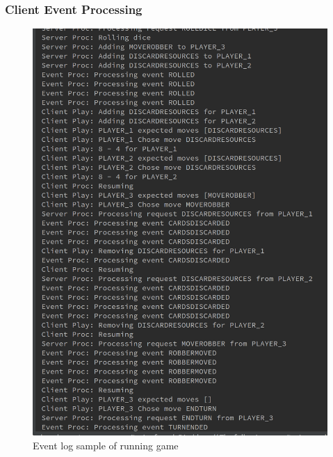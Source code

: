 \documentclass[a4paper,doc,draftfirst]{apa6}
\begin{document}
\subsubsection{Client Event Processing}
\begin{figure}[hbtp]
      \includegraphics[width=\textwidth]{eventlog}
      \caption{Event log sample of running game}
\end{figure}
\end{document}
